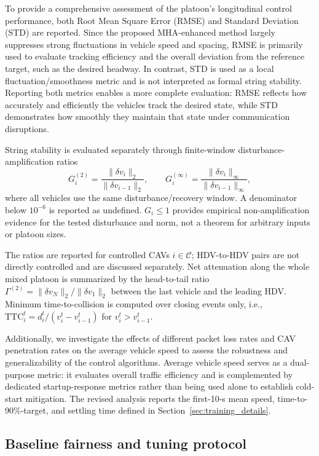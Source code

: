 \documentclass{ieeeaccess}
\begin{document}
To provide a comprehensive assessment of the platoon's longitudinal control performance, both Root Mean Square Error (RMSE)  and Standard Deviation (STD) are reported. Since the proposed MHA-enhanced method largely suppresses strong fluctuations in vehicle speed and spacing, RMSE is primarily used to evaluate tracking efficiency and the overall deviation from the reference target, such as the desired headway. In contrast, STD is used as a local fluctuation/smoothness metric and is not interpreted as formal string stability. Reporting both metrics enables a more complete evaluation: RMSE reflects how accurately and efficiently the vehicles track the desired state, while STD demonstrates how smoothly they maintain that state under communication disruptions.

String stability is evaluated separately through finite-window disturbance-amplification ratios
\begin{equation}
G_i^{(2)}=\frac{\|\delta v_i\|_2}{\|\delta v_{i-1}\|_2},
\qquad
G_i^{(\infty)}=\frac{\|\delta v_i\|_\infty}{\|\delta v_{i-1}\|_\infty},
\end{equation}
where all vehicles use the same disturbance/recovery window. A denominator below $10^{-6}$ is reported as undefined. $G_i\leq1$ provides empirical non-amplification evidence for the tested disturbance and norm, not a theorem for arbitrary inputs or platoon sizes. %

The ratios are reported for controlled CAVs $i\in\mathcal C$; HDV-to-HDV pairs are not directly controlled and are discussed separately. Net attenuation along the whole mixed platoon is summarized by the head-to-tail ratio $\Gamma^{(2)}=\|\delta v_N\|_2/\|\delta v_1\|_2$ between the last vehicle and the leading HDV. Minimum time-to-collision is computed over closing events only, i.e., $\mathrm{TTC}_i^t=d_i^t/(v_i^t-v_{i-1}^t)$ for $v_i^t>v_{i-1}^t$.

Additionally, we investigate the effects of different packet loss rates and CAV penetration rates on the average vehicle speed to assess the robustness and generalizability of the control algorithms. Average vehicle speed serves as a dual-purpose metric: it evaluates overall traffic efficiency and is complemented by dedicated startup-response metrics rather than being used alone to establish cold-start mitigation. The revised analysis reports the first-10-s mean speed, time-to-90\%-target, and settling time defined in Section~\ref{sec:training_details}.


\subsection{Baseline fairness and tuning protocol}
\label{sec:baseline_fairness}
\end{document}
